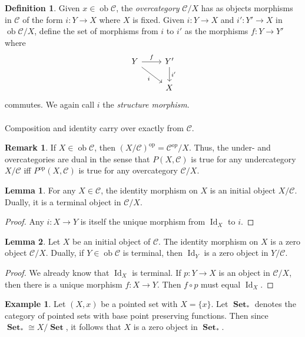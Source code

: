 \documentclass[10pt,letterpaper,cm]{nupset}
\theoremstyle{definition}
\newtheorem*{definition}{Definition}
\newtheorem{exmp}{Example}
\newtheorem{remark}{Remark}
\newtheorem{lemma}{Lemma}
\newcommand{\1}{\mathbf{1}}
\renewcommand{\c}{\mathscr{C}}
\newcommand{\0}{\vec 0}
\DeclareMathOperator{\id}{Id}
\DeclareMathOperator{\op}{op}
\DeclareMathOperator{\ob}{ob}
\DeclareMathOperator{\set}{\mathbf{Set}}
\begin{document}
\begin{definition}
Given $x \in \ob \c$, the \textit{overcategory} ${\c}/{X}$ has as objects morphisms in $\c$ of the form $i : Y \to X$ where $X$ is fixed. Given $i:  Y \to X$ and  $i' : Y' \to X$ in $\ob {\c}/{X}$, define the set of morphisms from $i$ to $i'$ as the morphisms $f: Y \to Y'$ where
\[ \begin{tikzcd}
Y \arrow[r, "f"] \arrow[swap, dr,  " i "] & Y' \arrow[d, "i '"] \\%
 & X
\end{tikzcd}
\]
commutes. We again call $i$ the \textit{structure morphism}.
\\ \\ Composition and identity carry over exactly from $\c$.
\end{definition}

\begin{remark}
If $X \in \ob \c$, then $({X}/{\c})^{\op} = {\c^{op}}/{X}$. Thus, the under- and overcategories are dual in the sense that $P(X, \c)$ is true for any undercategory ${X}/{\c}$ iff $P^{\op}(X, \c)$ is true for any overcategory ${\c}/{X}$. 
\end{remark}

\begin{lemma}
For any $X \in \c$, the identity morphism on $X$ is an initial object ${X}/{\c}$. Dually, it is a terminal object in ${\c}/{X}$.
\end{lemma}
\begin{proof}
Any $i: X \to Y$ is itself the unique morphism from $\id_X$ to $i$.
\end{proof}

\begin{lemma}
Let $X$ be an initial object of $\c$. The identity morphism on $X$ is a zero object ${\c}/{X}$. Dually, if $Y \in \ob \c$ is terminal, then $\id_Y$ is a zero object in ${Y}/{\c}$.
\end{lemma}
\begin{proof}
We already know that $\id_X$ is terminal. If $p: Y \to X$ is an object in ${\c}/{X}$, then there is a unique morphism $f: X \to Y$. Then $f\circ p$ must equal $\id_X$.
\end{proof}

\begin{exmp}
Let $(X, x)$ be a pointed set with $X= \{x\}$. Let $\set_{\ast}$ denotes the category of pointed sets with base point preserving functions. Then since $\set_{\ast} \cong {X}/{\set}$, it follows that $X$ is a zero object in $\set_{\ast}$.
\end{exmp}
\end{document}
